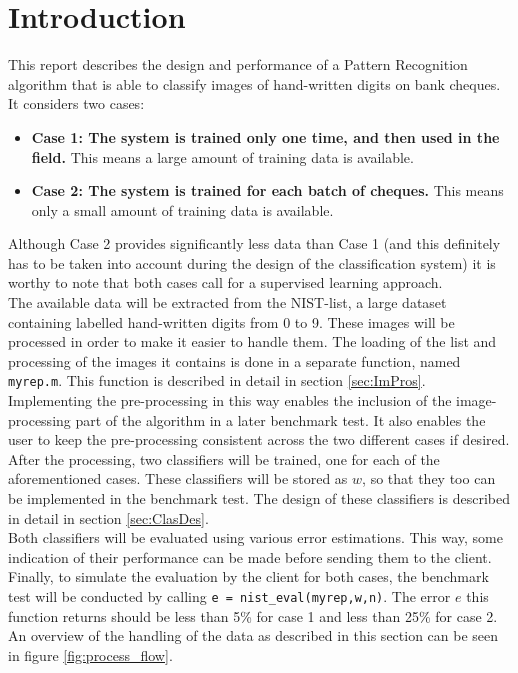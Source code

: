  \section{Introduction}
  \label{Intro}
  This report describes the design and performance of a Pattern Recognition algorithm that is able to classify images of hand-written digits on bank cheques. It considers two cases:
  \begin{itemize}
  	\item \textbf{Case 1: The system is trained only one time, and then used in the field.} This means a large amount of training data is available.
  	\item \textbf{Case 2: The system is trained for each batch of cheques.} This means only a small amount of training data is available.
  \end{itemize}
Although Case 2 provides significantly less data than Case 1 (and this definitely has to be taken into account during the design of the classification system) it is worthy to note that both cases call for a supervised learning approach. \\
The available data will be extracted from the NIST-list, a large dataset containing labelled hand-written digits from 0 to 9. These images will be processed in order to make it easier to handle them. The loading of the list and processing of the images it contains is done in a separate function, named \texttt{myrep.m}. This function is described in detail in section \ref{sec:ImPros}. Implementing the pre-processing in this way enables the inclusion of the image-processing part of the algorithm in a later benchmark test. It also enables the user to keep the pre-processing consistent across the two different cases if desired.\\
\noindent After the processing, two classifiers will be trained, one for each of the aforementioned cases. These classifiers will be stored as $w$, so that they too can be implemented in the benchmark test. The design of these classifiers is described in detail in section \ref{sec:ClasDes}. \\
Both classifiers will be evaluated using various error estimations. This way, some indication of their performance can be made before sending them to the client. \\
\noindent Finally, to simulate the evaluation by the client for both cases, the benchmark test will be conducted by calling \texttt{e = nist\_eval(myrep,w,n)}. The error $e$ this function returns should be less than 5\% for case 1 and less than 25\% for case 2. An overview of the handling of the data as described in this section can be seen in figure \ref{fig:process_flow}.
